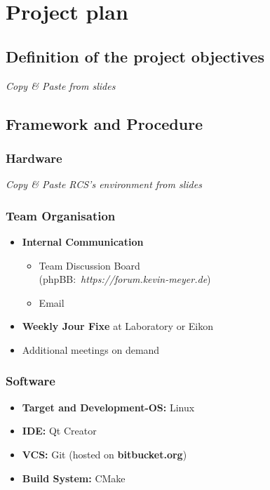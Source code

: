 \documentclass[12pt]{article}
\begin{document}
\section{Project plan}
\subsection{Definition of the project objectives}
\textit{Copy \& Paste from slides}

\subsection{Framework and Procedure}
\subsubsection*{Hardware}
\textit{Copy \& Paste RCS's environment from slides}\\

\subsubsection*{Team Organisation}
\begin{itemize}
	\item \textbf{Internal Communication}
	\begin{itemize}
		\item Team Discussion Board \\\mbox{(phpBB: \textit{https://forum.kevin-meyer.de})}
		\item Email
	\end{itemize}
	\item \textbf{Weekly Jour Fixe} at Laboratory or Eikon
	\item Additional meetings on demand
\end{itemize}

\subsubsection*{Software}
\begin{itemize}
	\item \textbf{Target and Development-OS:} Linux
	\item \textbf{IDE:} Qt Creator
	\item \textbf{VCS:} Git (hosted on \textbf{bitbucket.org})
	\item \textbf{Build System:} CMake
\end{itemize}
\end{document}
